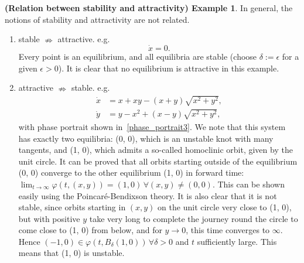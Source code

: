 \documentclass[12pt]{report}
\theoremstyle{definition}
\begin{document}
\newtheorem{relation between stability and attractivity}[theorem]{(Relation
between stability and attractivity) Example}
\begin{relation between stability and attractivity}
    In general, the notions of stability and attractivity are not related.
    \begin{enumerate}[label = (\roman*)]
        \item stable $\nRightarrow$ attractive. e.g.
            \[
                \dot{x}=0.
            \]
            Every point is an equilibrium, and all equilibria are stable
            (choose $\delta:=\epsilon$ for a given $\epsilon>0$). It is clear
            that no equilibrium is attractive in this example.
        \item attractive $\nRightarrow$ stable. e.g.
            \begin{align*}
                \dot{x} & =x+xy-(x+y)\sqrt{x^2+y^2}, \\
                \dot{y} & =y-x^{2}+(x-y)\sqrt{x^2+y^2},
            \end{align*} 
            with phase portrait shown in~\ref{phase_portrait3}.
            We note that this system has exactly two equilibria: (0, 0),
            which is an unstable knot with many tangents, and (1, 0),
            which admits a so-called homoclinic orbit, given by the unit circle.
            It can be proved that all orbits starting outside of the equilibrium
            (0, 0) converge to the other equilibrium (1, 0) in forward time:
            $\lim_{t\rightarrow\infty}\varphi(t,(x,y))=(1,0)\,\forall(x,y)\neq(0,0)$.
            This can be shown easily using the Poincar\'{e}-Bendixson theory.
            It is also clear that it is not stable, since orbits starting in
            $(x,y)$ on the unit circle very close to (1, 0), but with positive $y$
            take very long to complete the journey round the circle to come
            close to (1, 0) from below, and for $y\rightarrow 0$, this time
            converges to $\infty$. Hence
            $(-1,0)\in\varphi(t,B_{\delta}(1,0))\,\forall\delta>0$ and $t$
            sufficiently large. This means that (1, 0) is unstable.
    \end{enumerate} 
\end{relation between stability and attractivity}
\end{document}
